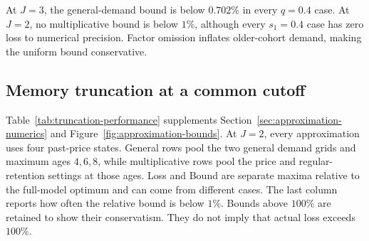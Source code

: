 At \(J=3\), the general-demand bound is below \(0.702\%\) in every \(q=0.4\) case. At \(J=2\), no multiplicative bound is below \(1\%\), although every \(s_1=0.4\) case has zero loss to numerical precision. Factor omission inflates older-cohort demand, making the uniform bound conservative.
\par\endgroup

\subsection{Memory truncation at a common cutoff}
\label{app:numerical-truncation}
Table~\ref{tab:truncation-performance} supplements Section~\ref{sec:approximation-numerics} and Figure~\ref{fig:approximation-bounds}. At \(J=2\), every approximation uses four past-price states. General rows pool the two general demand grids and maximum ages \(4,6,8\), while multiplicative rows pool the price and regular-retention settings at those ages. Loss and Bound are separate maxima relative to the full-model optimum and can come from different cases. The last column reports how often the relative bound is below \(1\%\). Bounds above \(100\%\) are retained to show their conservatism. They do not imply that actual loss exceeds \(100\%\).

\begin{table}[H]

\centering\small
\caption{Truncation at \(J=2\). Loss and Bound are separate maxima (\%). The last column gives the percentage of cases with bound below \(1\%\). General rows pool both response grids. Bounds are uncapped.}
\label{tab:truncation-performance}
\setlength{\tabcolsep}{5pt}

\end{table}
\FloatBarrier
